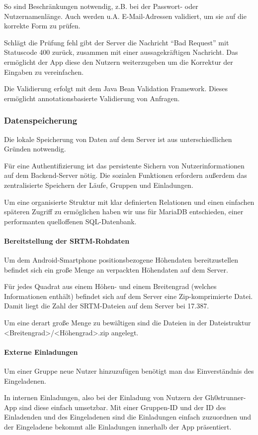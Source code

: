 So sind Beschränkungen notwendig, z.B. bei der Passwort- oder Nutzernamenlänge. Auch werden u.A. E-Mail-Adressen validiert, um sie auf die korrekte Form zu prüfen.

Schlägt die Prüfung fehl gibt der Server die Nachricht ``Bad Request'' mit Statuscode 400 zurück, zusammen mit einer aussagekräftigen Nachricht. Das ermöglicht der App diese den Nutzern weiterzugeben um die Korrektur der Eingaben zu vereinfachen.

Die Validierung erfolgt mit dem Java Bean Validation Framework. Dieses ermöglicht annotationsbasierte Validierung von Anfragen.
\subsubsection{Datenspeicherung}
Die lokale Speicherung von Daten auf dem Server ist aus unterschiedlichen Gründen notwendig.

Für eine Authentifizierung ist das persistente Sichern von Nutzerinformationen auf dem Backend-Server nötig. Die sozialen Funktionen erfordern außerdem das zentralisierte Speichern der Läufe, Gruppen und Einladungen.

Um eine organisierte Struktur mit klar definierten Relationen und einen einfachen späteren Zugriff zu ermöglichen haben wir uns für MariaDB entschieden, einer performanten quelloffenen SQL-Datenbank.
\paragraph{Bereitstellung der SRTM-Rohdaten}
Um dem Android-Smartphone positionsbezogene Höhendaten bereitzustellen befindet sich ein große Menge an verpackten Höhendaten auf dem Server.

Für jedes Quadrat aus einem Höhen- und einem Breitengrad (welches Informationen enthält) befindet sich auf dem Server eine Zip-komprimierte Datei. Damit liegt die Zahl der SRTM-Dateien auf dem Server bei 17.387.

Um eine derart große Menge zu bewältigen sind die Dateien in der Dateistruktur <Breitengrad>/<Höhengrad>.zip angelegt.
\paragraph{Externe Einladungen}
Um einer Gruppe neue Nutzer hinzuzufügen benötigt man das Einverständnis des Eingeladenen.

In internen Einladungen, also bei der Einladung von Nutzern der Gh0strunner-App sind diese einfach umsetzbar. Mit einer Gruppen-ID und der ID des Einladenden und des Eingeladenen sind die Einladungen einfach zuzuordnen und der Eingeladene bekommt alle Einladungen innerhalb der App präsentiert.

